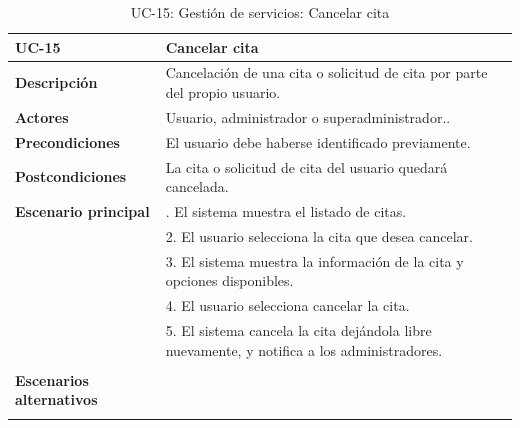 \begin{table}[H]
  \begin{center}
    \begin{tabularx}{16.4cm}{|l|X|}
      \hline
      \textbf{UC-15} & \textbf{Cancelar cita}\\
      \hline
      \textbf{Descripción} & Cancelación de una cita o solicitud de cita por parte del propio usuario. \\
      \hline
      \textbf{Actores} & Usuario, administrador o superadministrador..\\
      \hline
      \textbf{Precondiciones} & El usuario debe haberse identificado previamente.\\
      \hline
      \textbf{Postcondiciones} & La cita o solicitud de cita del usuario quedará cancelada.\\
      \hline
      \textbf{Escenario principal} & \smallskip 1. El sistema muestra el listado de citas.\\
      & 2. El usuario selecciona la cita que desea cancelar.\\
      & 3. El sistema muestra la información de la cita y opciones disponibles.\\
      & 4. El usuario selecciona cancelar la cita.\\
      & 5. El sistema cancela la cita dejándola libre nuevamente, y notifica a los administradores.\\
      & \\
      \hline
      \textbf{Escenarios alternativos} & \\
      & \\
      \hline
    \end{tabularx}
    \caption{UC-15: Gestión de servicios: Cancelar cita}
    \label{tab:CU-cancelar-cita}
  \end{center}
\end{table}


